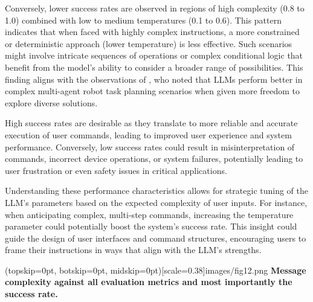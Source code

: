 \documentclass{ieeeaccess}
\begin{document}
Conversely, lower success rates are observed in regions of high complexity (0.8 to 1.0) combined with low to medium temperatures (0.1 to 0.6). This pattern indicates that when faced with highly complex instructions, a more constrained or deterministic approach (lower temperature) is less effective. Such scenarios might involve intricate sequences of operations or complex conditional logic that benefit from the model's ability to consider a broader range of possibilities. This finding aligns with the observations of \citet{kannan2024smartllmsmartmultiagentrobot}, who noted that LLMs perform better in complex multi-agent robot task planning scenarios when given more freedom to explore diverse solutions. 

High success rates are desirable as they translate to more reliable and accurate execution of user commands, leading to improved user experience and system performance. Conversely, low success rates could result in misinterpretation of commands, incorrect device operations, or system failures, potentially leading to user frustration or even safety issues in critical applications. 

Understanding these performance characteristics allows for strategic tuning of the LLM's parameters based on the expected complexity of user inputs. For instance, when anticipating complex, multi-step commands, increasing the temperature parameter could potentially boost the system's success rate. This insight could guide the design of user interfaces and command structures, encouraging users to frame their instructions in ways that align with the LLM's strengths.

\Figure[t!](topskip=0pt, botskip=0pt,
midskip=0pt)[scale=0.38]{{images/fig12.png}}
{ \textbf{Message complexity against all evaluation metrics and most importantly the success rate.}\label{fig12}}
\end{document}
